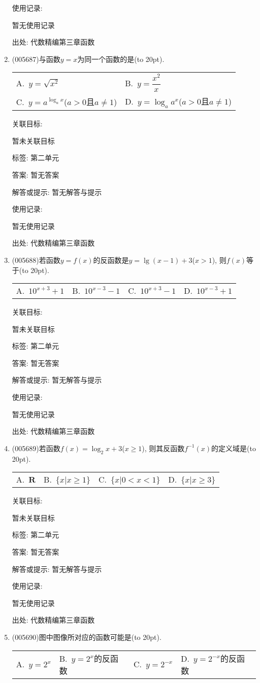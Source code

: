 \documentclass[10pt,a4paper]{article}
\newcommand{\bracket}[1]{(\hbox to #1pt{})}
\newcommand{\twoch}[4]{\par\begin{tabular}{p{.46\textwidth}p{.46\textwidth}}
A.~#1& B.~#2\\
C.~#3& D.~#4
\end{tabular}}
\newcommand{\fourch}[4]{\par\begin{tabular}{p{.23\textwidth}p{.23\textwidth}p{.23\textwidth}p{.23\textwidth}}
A.~#1 &B.~#2& C.~#3& D.~#4
\end{tabular}}
\begin{document}
\begin{enumerate}[1.]
使用记录:

暂无使用记录


出处: 代数精编第三章函数
\item { (005687)}与函数$y=x$为同一个函数的是\bracket{20}.
\twoch{$y=\sqrt {x^2}$}{$y=\dfrac{x^2}x$}{$y=a^{\log_ax}$($a>0$且$a\ne 1$)}{$y=\log_aa^x$($a>0$且$a\ne 1$)}


关联目标:

暂未关联目标



标签: 第二单元

答案: 暂无答案

解答或提示: 暂无解答与提示

使用记录:

暂无使用记录


出处: 代数精编第三章函数
\item { (005688)}若函数$y=f(x)$的反函数是$y=\lg (x-1)+3$($x>1$), 则$f(x)$等于\bracket{20}.
\fourch{$10^{x+3}+1$}{$10^{x-3}-1$}{$10^{x+3}-1$}{$10^{x-3}+1$}


关联目标:

暂未关联目标



标签: 第二单元

答案: 暂无答案

解答或提示: 暂无解答与提示

使用记录:

暂无使用记录


出处: 代数精编第三章函数
\item { (005689)}若函数$f(x)=\log_2x+3$($x\ge 1$), 则其反函数$f^{-1}(x)$的定义域是\bracket{20}.
\fourch{$\mathbf{R}$}{$\{x|x\ge 1\}$}{$\{x|0<x<1\}$}{$\{x|x\ge 3\}$}


关联目标:

暂未关联目标



标签: 第二单元

答案: 暂无答案

解答或提示: 暂无解答与提示

使用记录:

暂无使用记录


出处: 代数精编第三章函数
\item { (005690)}图中图像所对应的函数可能是\bracket{20}.
\begin{center}
\end{center}
\fourch{$y=2^x$}{$y=2^x$的反函数}{$y=2^{-x}$}{$y=2^{-x}$的反函数}



\end{enumerate}
\end{document}
